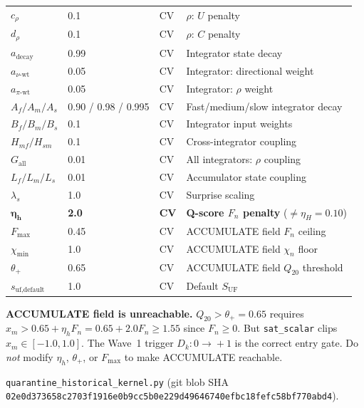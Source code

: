 \documentclass[11pt,a4paper]{article}
\newcommand{\sha}[1]{\texttt{\footnotesize#1}}
\begin{document}
\begin{center}
\begin{longtable}{L{3.0cm}R{2.8cm}C{1.2cm}L{5.5cm}}
$c_\rho$           & 0.1           & CV & $\rho$: $U$ penalty\\
$d_\rho$           & 0.1           & CV & $\rho$: $C$ penalty\\
$a_{\text{decay}}$ & 0.99          & CV & Integrator state decay\\
$a_{\nu\text{-wt}}$& 0.05          & CV & Integrator: directional weight\\
$a_{\pi\text{-wt}}$& 0.05          & CV & Integrator: $\rho$ weight\\
$A_f / A_m / A_s$  & 0.90 / 0.98 / 0.995 & CV & Fast/medium/slow integrator decay\\
$B_f / B_m / B_s$  & 0.1           & CV & Integrator input weights\\
$H_{mf} / H_{sm}$  & 0.1           & CV & Cross-integrator coupling\\
$G_{\text{all}}$   & 0.01          & CV & All integrators: $\rho$ coupling\\
$L_f / L_m / L_s$  & 0.01          & CV & Accumulator state coupling\\
$\lambda_s$        & 1.0           & CV & Surprise scaling\\
$\boldsymbol{\eta_h}$ & \textbf{2.0} & \textbf{CV} & \textbf{Q-score $F_n$ penalty} ($\neq \eta_H=0.10$)\\
$F_{\max}$         & 0.45          & CV & ACCUMULATE field $F_n$ ceiling\\
$\chi_{\min}$      & 1.0           & CV & ACCUMULATE field $\chi_n$ floor\\
$\theta_+$         & 0.65          & CV & ACCUMULATE field $Q_{20}$ threshold\\
$s_{\text{uf,default}}$ & 1.0      & CV & Default $S_{\text{UF}}$\\
\end{longtable}
\end{center}

\begin{warningbox}
\textbf{ACCUMULATE field is unreachable.} $Q_{20} > \theta_+ = 0.65$ requires $x_m > 0.65 + \eta_h F_n = 0.65 + 2.0 F_n \geq 1.55$ since $F_n \geq 0$. But \texttt{sat\_scalar} clips $x_m \in [-1.0, 1.0]$. The Wave~1 trigger $D_k\!: 0\!\to\!+1$ is the correct entry gate. Do \emph{not} modify $\eta_h$, $\theta_+$, or $F_{\max}$ to make ACCUMULATE reachable.
\end{warningbox}

\begin{sourcebox}
\texttt{quarantine\_historical\_kernel.py} (git blob SHA \sha{02e0d373658c2703f1916e0b9cc5b0e229d49646740efbc18fefc58bf770abd4}).
\end{sourcebox}
\end{document}
